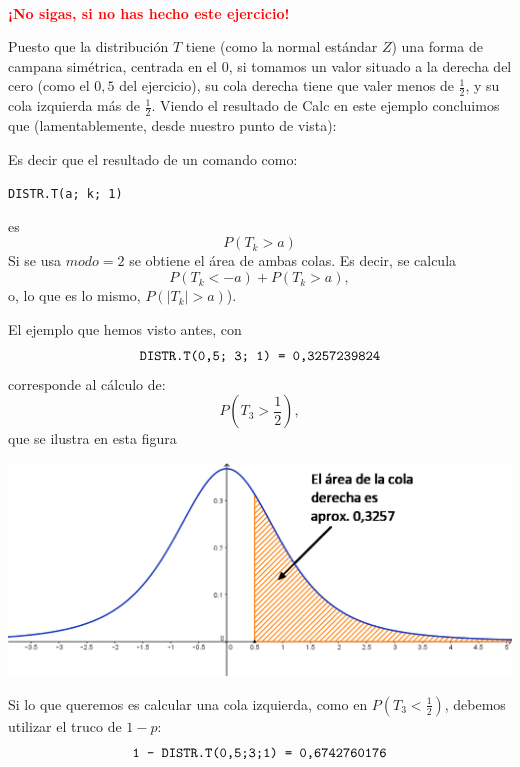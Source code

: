 \documentclass[10pt,a4paper]{article}\usepackage[]{graphicx}\usepackage[]{color}
\begin{document}
\quad\\
\vspace{1cm}
\begin{center}
\textcolor{red}{\bf\LARGE ¡No sigas, si no has hecho este ejercicio!}
\end{center}

\newpage

Puesto que la distribución $T$ tiene (como la normal estándar $Z$) una forma de campana simétrica, centrada en el 0, si tomamos un valor situado a la derecha del cero (como el $0,5$ del ejercicio), su cola derecha tiene que valer menos de $\frac{1}{2}$, y su cola izquierda más de $\frac{1}{2}$. Viendo el resultado de Calc en este ejemplo concluimos que (lamentablemente, desde nuestro punto de vista):
    \begin{center}
    \end{center}
Es decir que el resultado de un comando como:
    \begin{center}
    {\tt DISTR.T(a; k; 1)}
    \end{center}
es
    \[P(T_k > a)\]
Si se usa $modo = 2$ se obtiene el área de ambas colas. Es decir, se calcula
\[P( T_k < -a) + P(T_k > a),\]
o, lo que es lo mismo, $P(|T_k| > a)$).

El ejemplo que hemos visto antes, con
    \[\mbox{\tt DISTR.T(0,5; 3; 1) = 0,3257239824}\]
corresponde al cálculo de:
\[P\left(T_3 > \frac{1}{2}\right),\]
que se ilustra en esta figura
    \begin{center}
    \includegraphics[width=14cm]{../fig/Tut06-12.png}
    \end{center}
Si lo que queremos es calcular una cola izquierda, como en $P(T_3 < \frac{1}{2})$, debemos utilizar el truco de $1 - p$:
    \[\mbox{\tt 1 - DISTR.T(0,5;3;1) = 0,6742760176}\]
\end{document}
